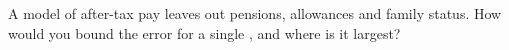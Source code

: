 \begin{interviewq}\label{iq:in:pay-regulation-and-tax-by-location:6}
A model of after-tax pay leaves out pensions, allowances and family status. How would you bound the error for a single
, and where is it largest?
\end{interviewq}
